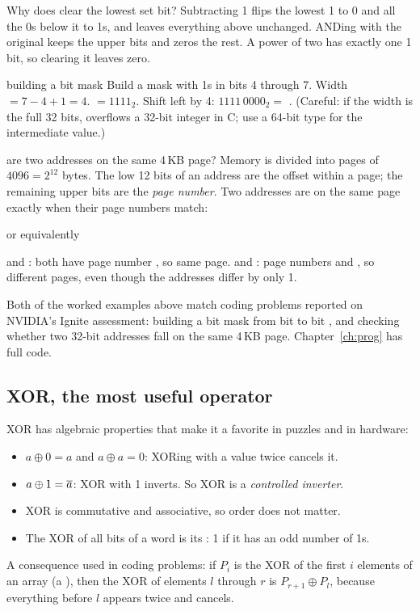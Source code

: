 Why does  clear the lowest set bit? Subtracting 1 flips the lowest 1 to 0 and all the 0s below it to 1s, and leaves everything above unchanged. ANDing with the original keeps the upper bits and zeros the rest. A power of two has exactly one 1 bit, so clearing it leaves zero.

\begin{worked}{building a bit mask}
Build a mask with 1s in bits 4 through 7. Width $= 7 - 4 + 1 = 4$.  $= 1111_2$. Shift left by 4: $1111\,0000_2 =$ . (Careful: if the width is the full 32 bits,  overflows a 32-bit integer in C; use a 64-bit type for the intermediate value.)
\end{worked}

\begin{worked}{are two addresses on the same 4\,KB page?}
Memory is divided into pages of $4096 = 2^{12}$ bytes. The low 12 bits of an address are the offset within a page; the remaining upper bits are the \emph{page number}. Two addresses are on the same page exactly when their page numbers match:
\begin{center}
 \qquad or equivalently \qquad {}
\end{center}
 and : both have page number , so same page.  and : page numbers  and , so different pages, even though the addresses differ by only 1.
\end{worked}

\begin{onoa}
Both of the worked examples above match coding problems reported on NVIDIA's Ignite assessment: building a bit mask from bit  to bit , and checking whether two 32-bit addresses fall on the same 4\,KB page. Chapter~\ref{ch:prog} has full code.
\end{onoa}

\subsection*{XOR, the most useful operator}

XOR has algebraic properties that make it a favorite in puzzles and in hardware:
\begin{itemize}
  \item $a \oplus 0 = a$ and $a \oplus a = 0$: XORing with a value twice cancels it.
  \item $a \oplus 1 = \overline{a}$: XOR with 1 inverts. So XOR is a \emph{controlled inverter}.
  \item XOR is commutative and associative, so order does not matter.
  \item The XOR of all bits of a word is its : 1 if it has an odd number of 1s.
\end{itemize}
A consequence used in coding problems: if $P_i$ is the XOR of the first $i$ elements of an array (a ), then the XOR of elements $l$ through $r$ is $P_{r+1} \oplus P_l$, because everything before $l$ appears twice and cancels.


